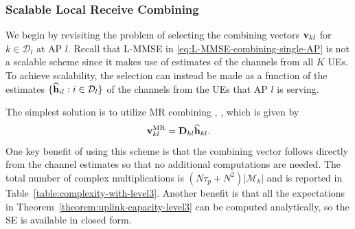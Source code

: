  

\subsubsection{Scalable Local Receive Combining}

We begin by revisiting the problem of selecting the combining vectors $ \mathbf{v}_{kl}$ for $k \in \mathcal{D}_l $ at AP $l$.  Recall that L-MMSE in \eqref{eq:L-MMSE-combining-single-AP} is not a scalable scheme since it makes use of estimates of the channels from all $K$ UEs.
To achieve scalability, the selection can instead be made as a function of the estimates $\{\widehat{\mathbf{h}}_{il} : i \in \mathcal{D}_l \}$ of the channels from the UEs that AP $l$ is serving. 

The simplest solution is to utilize MR combining \cite{Nayebi2016a}, \cite{Ngo2017b}, which is given by
\begin{equation}
\mathbf{v}_{kl}^{{\rm MR}} = \mathbf{D}_{kl}\widehat{\mathbf{h}}_{kl}.
\end{equation}
One key benefit of using this scheme is that the combining vector follows directly from the channel estimates so that no additional computations are needed. The total number of complex multiplications is  $\left(N\tau_p+N^2\right)|\mathcal{M}_k|$ and is reported in Table~\ref{table:complexity-with-level3}. Another benefit is that all the expectations in Theorem~\ref{theorem:uplink-capacity-level3} can be computed analytically, so the SE is available in closed form.

